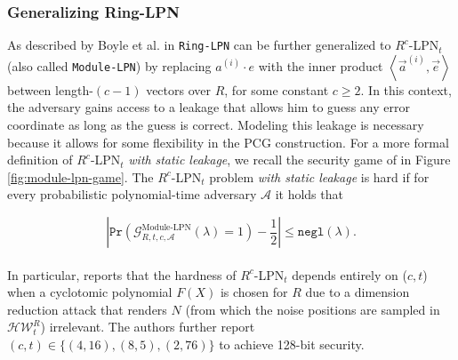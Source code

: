 \subsubsection{Generalizing Ring-LPN}
As described by Boyle et al. in \cite{boyle2020efficient} \texttt{Ring-LPN} can be further generalized to $R^{c}$-LPN$_{t}$ (also called \texttt{Module-LPN}) by replacing $a^{(i)} \cdot e$ with the inner product $\left\langle\vec{a}^{(i)}, \vec{e}\right\rangle$ between length-$(c-1)$ vectors over $R$, for some constant $c \geq 2$. In this context, the adversary gains access to a leakage that allows him to guess any error coordinate as long as the guess is correct. Modeling this leakage is necessary because it allows for some flexibility in the PCG construction. For a more formal definition of $R^{c}$-LPN$_{t}$ \textit{with} \textit{static leakage}, we recall the security game of \cite{abram2022low} in Figure \ref{fig:module-lpn-game}. The $R^{c}$-LPN$_{t}$ problem \textit{with static leakage} is hard if for every probabilistic polynomial-time adversary $\mathcal{A}$ it holds that

$$
\left|\texttt{Pr}\left(\mathcal{G}_{R, t, c,\mathcal{A}}^{\text{Module-LPN}}(\lambda) = 1\right) - \frac{1}{2}\right|\leq \texttt{negl}(\lambda) .
$$
\\
In particular, \cite{boyle2020efficient} reports that the hardness of $R^{c}$-LPN$_{t}$ depends entirely on ($c,t$) when a cyclotomic polynomial $F(X)$ is chosen for $R$ due to a dimension reduction attack that renders $N$ (from which the noise positions are sampled in $\mathcal{H W}_{t}^{R}$) irrelevant. The authors further report $(c,t) \in \{(4,16),(8,5),(2,76)\}$ to achieve 128-bit security.

